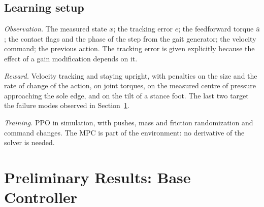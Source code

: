\documentclass[conference]{IEEEtran}
\newcommand{\ub}{\bar{u}}
\begin{document}
\begin{table}[t]
\caption{Parametrizations of the residual on the feedback policy}
\label{tab:param}
\centering
\setlength{\tabcolsep}{3pt}
\end{table}

\subsection{Learning setup}
\emph{Observation.} The measured state $x$; the tracking error $e$; the feedforward torque $\ub$; the contact flags and the phase of the step from the gait generator; the velocity command; the previous action.
The tracking error is given explicitly because the effect of a gain modification depends on it.

\emph{Reward.} Velocity tracking and staying upright, with penalties on the size and the rate of change of the action, on joint torques, on the measured centre of pressure approaching the sole edge, and on the tilt of a stance foot.
The last two target the failure modes observed in Section~\ref{sec:results}.

\emph{Training.} PPO \cite{schulman2017ppo} in simulation, with pushes, mass and friction randomization and command changes.
The MPC is part of the environment: no derivative of the solver is needed.

\section{Preliminary Results: Base Controller}
\label{sec:results}
\end{document}
